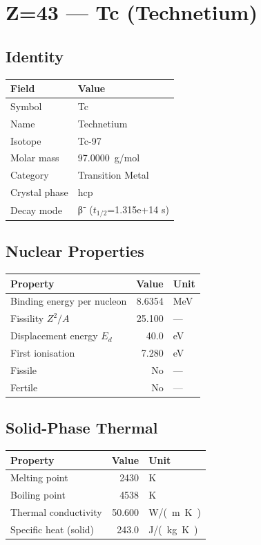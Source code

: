 \documentclass[11pt,a4paper]{article}
\begin{document}
\newpage

\section{Z=43 --- Tc (Technetium)}
\label{sec:Z43}

\subsection{Identity}
\begin{tabular}{ll}
  \toprule
  Field & Value \\
  \midrule
  Symbol & Tc \\
  Name & Technetium \\
  Isotope & Tc-97 \\
  Molar mass & \SI{97.0000}{g/mol} \\
  Category & Transition Metal \\
  Crystal phase & hcp \\
  Decay mode & β⁻ ($t_{1/2}$=1.315e+14 s) \\
  \bottomrule
\end{tabular}

\subsection{Nuclear Properties}
\begin{tabular}{lrl}
  \toprule
  Property & Value & Unit \\
  \midrule
  Binding energy per nucleon & 8.6354 & \si{MeV} \\
  Fissility $Z^2/A$ & 25.100 & --- \\
  Displacement energy $E_d$ & 40.0 & \si{eV} \\
  First ionisation & 7.280 & \si{eV} \\
  Fissile & No & --- \\
  Fertile & No & --- \\
  \bottomrule
\end{tabular}

\subsection{Solid-Phase Thermal}
\begin{tabular}{lrl}
  \toprule
  Property & Value & Unit \\
  \midrule
  Melting point & 2430 & \si{K} \\
  Boiling point & 4538 & \si{K} \\
  Thermal conductivity & 50.600 & \si{W/(m.K)} \\
  Specific heat (solid) & 243.0 & \si{J/(kg.K)} \\
  \bottomrule
\end{tabular}
\end{document}
